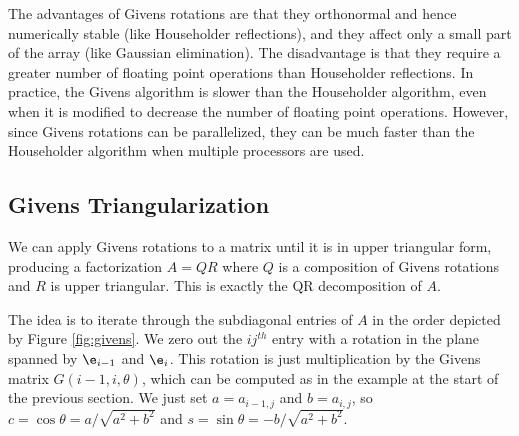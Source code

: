 The advantages of Givens rotations are that they orthonormal and hence numerically stable (like Householder reflections), and they affect only a small part of the array (like Gaussian elimination).
The disadvantage is that they require a greater number of floating point operations than Householder reflections.
In practice, the Givens algorithm is slower than the Householder algorithm, even when it is modified to decrease the number of floating point operations.
However, since Givens rotations can be parallelized, they can be much faster than the Householder algorithm when multiple processors are used.

\subsection*{Givens Triangularization} %

We can apply Givens rotations to a matrix until it is in upper triangular form, producing a factorization $A = QR$ where $Q$ is a composition of Givens rotations and $R$ is upper triangular.
This is exactly the QR decomposition of $A$.

The idea is to iterate through the subdiagonal entries of $A$ in the order depicted by Figure \ref{fig:givens}.
We zero out the $ij^{th}$ entry with a rotation in the plane spanned by $\e_{i-1}$ and $\e_i$.
This rotation is just multiplication by the Givens matrix $G(i-1,i,\theta)$, which can be computed as in the example at the start of the previous section.
We just set $a=a_{i-1,j}$ and $b=a_{i,j}$, so $c = \cos \theta = a/\sqrt{a^2+b^2}$ and $s = \sin \theta = -b/\sqrt{a^2+b^2}$.

